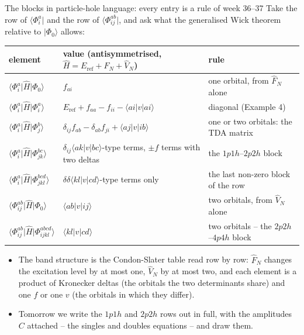 \documentclass[aspectratio=169,10pt]{beamer}
\newcommand{\ket}[1]{\vert #1\rangle}
\newcommand{\bra}[1]{\langle #1\vert}
\newcommand{\element}[3]{\langle #1\vert #2\vert #3\rangle}
\begin{document}
\begin{frame}{The blocks in particle-hole language: every entry is a rule of week 36--37}
  \footnotesize
  Take the row of $\bra{\Phi_i^a}$ and the row of $\bra{\Phi_{ij}^{ab}}$, and ask what the generalised Wick theorem relative to $\ket{\Phi_0}$ allows:
  \begin{center}\footnotesize
  \renewcommand{\arraystretch}{1.15}
  \begin{tabular}{lll}
    \toprule
    element & value (antisymmetrised, $\hat{H}=E_{\mathrm{ref}}+\hat{F}_N+\hat{V}_N$) & rule\\
    \midrule
    $\bra{\Phi_i^a}\hat{H}\ket{\Phi_0}$ & $f_{ai}$ & one orbital, from $\hat{F}_N$ alone\\
    $\bra{\Phi_i^a}\hat{H}\ket{\Phi_i^a}$ & $E_{\mathrm{ref}}+f_{aa}-f_{ii}-\element{ai}{v}{ai}$ & diagonal (Example 4)\\
    $\bra{\Phi_i^a}\hat{H}\ket{\Phi_j^b}$ & $\delta_{ij}f_{ab}-\delta_{ab}f_{ji}+\element{aj}{v}{ib}$ & one or two orbitals: the TDA matrix\\
    $\bra{\Phi_i^a}\hat{H}\ket{\Phi_{jk}^{bc}}$ & $\delta_{ij}\element{ak}{v}{bc}$-type terms, $\pm f$ terms with two deltas & the $1p1h$--$2p2h$ block\\
    $\bra{\Phi_i^a}\hat{H}\ket{\Phi_{jkl}^{bcd}}$ & $\delta\delta\element{kl}{v}{cd}$-type terms only & the last non-zero block of the row\\
    $\bra{\Phi_{ij}^{ab}}\hat{H}\ket{\Phi_0}$ & $\element{ab}{v}{ij}$ & two orbitals, from $\hat{V}_N$ alone\\
    $\bra{\Phi_{ij}^{ab}}\hat{H}\ket{\Phi_{ijkl}^{abcd}}$ & $\element{kl}{v}{cd}$ & two orbitals -- the $2p2h$--$4p4h$ block\\
    \bottomrule
  \end{tabular}
  \end{center}
  \begin{itemize}
    \item \alert{The band structure is the Condon-Slater table read row by row}: $\hat{F}_N$ changes the excitation level by at most one, $\hat{V}_N$ by at most two, and each element is a product of Kronecker deltas (the orbitals the two determinants share) and one $f$ or one $v$ (the orbitals in which they differ).
    \item Tomorrow we write the $1p1h$ and $2p2h$ rows out in full, with the amplitudes $C$ attached -- the singles and doubles equations -- and draw them.
  \end{itemize}
\end{frame}
\end{document}
